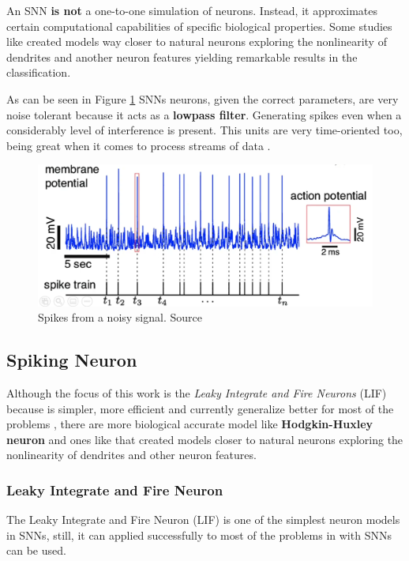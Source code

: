 		
		\par An SNN \textbf{is not} a one-to-one simulation of neurons. Instead, it approximates certain computational capabilities of specific biological properties. Some studies like \cite{jones2020single} created models way closer to natural neurons exploring the nonlinearity of dendrites and another neuron features yielding remarkable results in the classification.
		
			\par As can be seen in Figure \ref{fig:neuronspike} SNNs neurons, given the correct parameters, are very noise tolerant because it acts as a \textbf{lowpass filter}. Generating spikes even when a considerably level of interference is present. This units are very time-oriented too, being great when it comes to process streams of data \cite{10242251}.

			\begin{figure}[H]
				\centering
				\includegraphics[width=\linewidth]{images/neuronSpikes}
				\caption{Spikes from a noisy signal. Source \cite{dan_goodman_2022_7044500}}
				\label{fig:neuronspike}
			\end{figure} 

	\subsection{Spiking Neuron}
		\par Although the focus of this work is the \textit{Leaky Integrate and Fire Neurons} (LIF) because is simpler, more efficient and currently generalize better for most of the problems \cite{dan_goodman_2022_7044500}, there are more biological accurate model like \textbf{Hodgkin-Huxley neuron} \cite{gerstner2014neuronal} and ones like \cite{jones2020single} that created models closer to natural neurons exploring the nonlinearity of dendrites and other neuron features.
	
		\subsubsection{Leaky Integrate and Fire Neuron}
			\par The Leaky Integrate and Fire Neuron (LIF) is one of the simplest neuron models in SNNs, still, it can applied successfully to most of the problems in with SNNs can be used.

